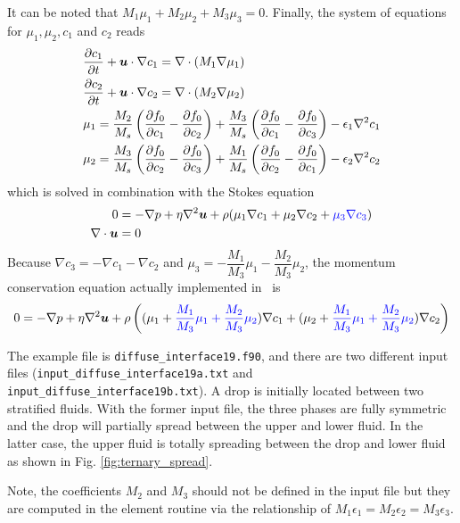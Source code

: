 It can be noted that $M_1 \mu_1 + M_2 \mu_2 + M_3 \mu_3 = 0$.
Finally, the system of equations for $\mu_1, \mu_2, c_1$ and $c_2$ reads
\begin{align}
& \dfrac{\partial c_1}{\partial t} + \boldsymbol{u} \cdot \nabla c_1 =
\nabla \cdot \left( M_1 \nabla \mu_1 \right)
\\
& \dfrac{\partial c_2}{\partial t} + \boldsymbol{u} \cdot \nabla c_2 =
\nabla \cdot \left( M_2 \nabla \mu_2 \right)
\\
& \mu_1 = \frac{M_2}{M_s} \left( \dfrac{\partial f_0}{\partial c_1} - \dfrac{\partial f_0}{\partial c_2} \right)
      + \frac{M_3}{M_s} \left( \dfrac{\partial f_0}{\partial c_1} - \dfrac{\partial f_0}{\partial c_3} \right)
      - \epsilon_1 \nabla^2 c_1
\\
& \mu_2 = \frac{M_3}{M_s} \left( \dfrac{\partial f_0}{\partial c_2} - \dfrac{\partial f_0}{\partial c_3} \right)
      + \frac{M_1}{M_s} \left( \dfrac{\partial f_0}{\partial c_2} - \dfrac{\partial f_0}{\partial c_1} \right)
      - \epsilon_2 \nabla^2 c_2
\end{align}
which is solved in combination with the Stokes equation
\begin{align}
0& = -\nabla p + \eta\nabla^2 {\boldsymbol{u}}
   + \rho (\mu_1\nabla c_1 + \mu_2\nabla c_2 + \textcolor{blue}{\mu_3 \nabla c_3})
\\
\nabla \cdot {\boldsymbol{u}}  &=0
\end{align}
Because $\nabla c_3 = - \nabla c_1 - \nabla c_2$ and
$\mu_3 = - \dfrac{M_1}{M_3} \mu_1 - \dfrac{M_2}{M_3} \mu_2$,
the momentum conservation equation actually implemented in \tfem\ is
\begin{equation}
0 = -\nabla p + \eta\nabla^2 {\boldsymbol{u}}
   + \rho \left( (\mu_1 + \textcolor{blue}{ \frac{M_1}{M_3} \mu_1
                               + \frac{M_2}{M_3} \mu_2 } ) \nabla c_1
               + (\mu_2 + \textcolor{blue}{ \frac{M_1}{M_3} \mu_1
                               + \frac{M_2}{M_3} \mu_2 } )\nabla c_2
          \right)
\end{equation}

The example file is \texttt{diffuse\_interface19.f90}, and
there are two different input files (\texttt{input\_diffuse\_interface19a.txt} and
\texttt{input\_diffuse\_interface19b.txt}).
A drop is initially located between two stratified fluids.
With the former input file, the three phases are fully symmetric and the drop will partially spread between the upper and lower fluid.
In the latter case, the upper fluid is totally spreading between the drop and lower fluid as shown in Fig. \ref{fig:ternary_spread}.

Note, the coefficients $M_2$ and $M_3$ should not be defined in the input file
but they are computed in the element routine via the relationship of
$M_1 \epsilon_1 = M_2 \epsilon_2 = M_3 \epsilon_3$.

